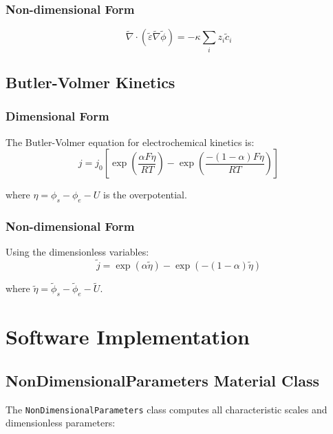 \documentclass[11pt,a4paper]{article}
\newcommand{\tildevar}[1]{\tilde{#1}}
\begin{document}
\subsubsection{Non-dimensional Form}
\begin{equation}
\tildevar{\nabla} \cdot (\tildevar{\varepsilon} \tildevar{\nabla} \tildevar{\phi}) = -\kappa \sum_i z_i \tildevar{c}_i
\label{eq:poisson_nondim}
\end{equation}

\subsection{Butler-Volmer Kinetics}

\subsubsection{Dimensional Form}

The Butler-Volmer equation for electrochemical kinetics is:
\begin{equation}
j = j_0 \left[ \exp\left(\frac{\alpha F \eta}{RT}\right) - \exp\left(\frac{-(1-\alpha) F \eta}{RT}\right) \right]
\label{eq:butler_volmer_dim}
\end{equation}

where $\eta = \phi_s - \phi_e - U$ is the overpotential.

\subsubsection{Non-dimensional Form}

Using the dimensionless variables:
\begin{equation}
\tildevar{j} = \exp(\alpha \tildevar{\eta}) - \exp(-(1-\alpha) \tildevar{\eta})
\label{eq:butler_volmer_nondim}
\end{equation}

where $\tildevar{\eta} = \tildevar{\phi}_s - \tildevar{\phi}_e - \tildevar{U}$.

\section{Software Implementation}

\subsection{NonDimensionalParameters Material Class}

The \texttt{NonDimensionalParameters} class computes all characteristic scales and dimensionless parameters:
\end{document}
